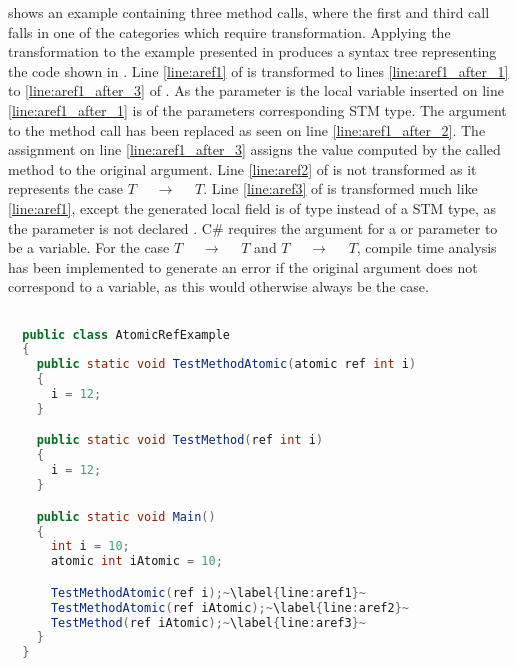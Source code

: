  shows an example containing three method calls, where the first and third call falls in one of the categories which require transformation. Applying the transformation to the example presented in  produces a syntax tree representing the code shown in . Line \ref{line:aref1} of  is transformed to lines \ref{line:aref1_after_1} to \ref{line:aref1_after_3} of . As the parameter is  the local variable inserted on line \ref{line:aref1_after_1} is of the parameters corresponding \ac{STM} type. The argument to the method call has been replaced as seen on line \ref{line:aref1_after_2}. The assignment on line \ref{line:aref1_after_3} assigns the value computed by the called method to the original argument. Line \ref{line:aref2} of  is not transformed as it represents the case  $T$ $\quad \rightarrow \quad$  $T$. Line \ref{line:aref3} of  is transformed much like \ref{line:aref1}, except the generated local field is of type  instead of a \ac{STM} type, as the parameter is not declared . C\# requires the argument for a  or  parameter to be a variable. For the case $T$ $\quad \rightarrow \quad$  $T$ and  $T$ $\quad \rightarrow \quad$ $T$,  compile time analysis has been implemented to generate an error if the original argument does not correspond to a variable, as this would otherwise always be the case.


\begin{lstlisting}[label=lst:before_atomic_ref,
  caption={\bscode{ref} Arguments Before Transformation},
  language=Java,  
  showspaces=false,
  showtabs=false,
  breaklines=true,
  showstringspaces=false,
  breakatwhitespace=true,
  escapechar=~,
  commentstyle=\color{greencomments},
  keywordstyle=\color{bluekeywords},
  stringstyle=\color{redstrings},
  morekeywords={atomic, retry, orelse, var, get, set, ref, out}]  % Start your code-block

  public class AtomicRefExample
  {
    public static void TestMethodAtomic(atomic ref int i)
    {
      i = 12;
    }

    public static void TestMethod(ref int i)
    {
      i = 12;
    }

    public static void Main()
    {
      int i = 10;
      atomic int iAtomic = 10;

      TestMethodAtomic(ref i);~\label{line:aref1}~
      TestMethodAtomic(ref iAtomic);~\label{line:aref2}~
      TestMethod(ref iAtomic);~\label{line:aref3}~
    }
  }
\end{lstlisting}

